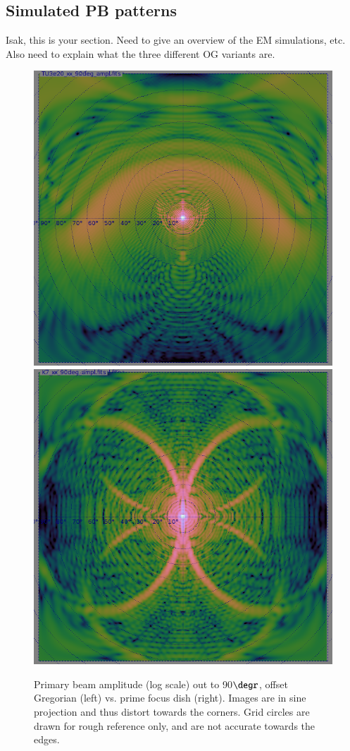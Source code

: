 \documentclass{aa}
\begin{document}
\subsection{Simulated PB patterns}
\label{sec:emsims}

Isak, this is your section. Need to give an overview of the EM simulations, etc. Also need to explain what the three different OG variants are.

\begin{figure}
  \includegraphics[width=\columnwidth]{beam-og-90}\hfill%
  \includegraphics[width=\columnwidth]{beam-pf-90}
  \caption{\label{fig:pb90}Primary beam amplitude (log scale) out to 90$\degr$, offset Gregorian (left) vs. prime focus dish (right). Images are in sine projection and thus distort towards the corners. Grid circles are drawn for rough reference only, and are not accurate towards the edges.}
\end{figure}
\end{document}
